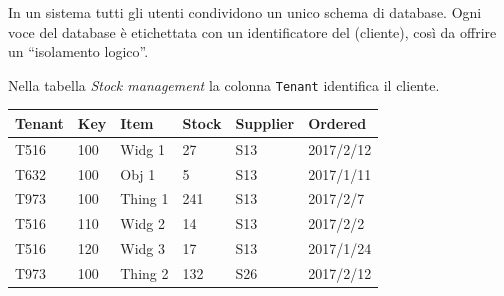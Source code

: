 \begin{definizione}
In un sistema  tutti gli utenti condividono un unico schema di database. Ogni voce del
database è etichettata con un identificatore del  (cliente), così da offrire un ``isolamento logico''.
\end{definizione}

\begin{esempio}
Nella tabella \emph{Stock management} la colonna \texttt{Tenant} identifica il cliente.

\smallskip
\small
\begin{tabular}{@{}llllll@{}}
\toprule
Tenant & Key & Item & Stock & Supplier & Ordered \\
\midrule
T516 & 100 & Widg 1 & 27 & S13 & 2017/2/12 \\
T632 & 100 & Obj 1 & 5 & S13 & 2017/1/11 \\
T973 & 100 & Thing 1 & 241 & S13 & 2017/2/7 \\
T516 & 110 & Widg 2 & 14 & S13 & 2017/2/2 \\
T516 & 120 & Widg 3 & 17 & S13 & 2017/1/24 \\
T973 & 100 & Thing 2 & 132 & S26 & 2017/2/12 \\
\bottomrule
\end{tabular}
\end{esempio}

